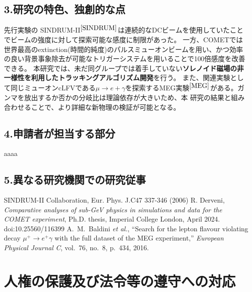\documentclass[11pt,a4j,dvipdfmx]{jarticle} 					%
\newcommand{\研究課題名}{ミューオン電子転換探索の感度向上に向けた解析手法の開発}
\newcommand{\研究機関名}{大阪大学}
\newcommand{\研究代表者氏名}{高見 翔太   }
\newcommand{\mysubsection}[1]{\vspace{-20pt}\subsection*{\colorbox{cyan!15}{\normalsize{#1}}}\vspace{-0.2cm}}
\begin{document}
\mysubsection{3.研究の特色、独創的な点}
先行実験の SINDRUM-I\hspace{-1.2pt}I$^{\cite{SINDRUM}}$は連続的なDCビームを使用していたことでビームの強度に対して探索可能な感度に制限があった。
一方、COMETでは世界最高のextinction(時間的純度)のパルスミューオンビームを用い、かつ効率の良い背景事象除去が可能なトリガーシステムを用いることで100倍感度を改善できる。
本研究では、未だ同グループでは着手していない\textbf{ソレノイド磁場の非一様性を利用したトラッキングアルゴリズム開発}を行う。
また、関連実験として同じミューオンcLFVである$\mu \rightarrow e + \gamma$を探索するMEG実験$^{\cite{MEG}}$がある。ガンマを放出するか否かの分岐比は理論依存が大きいため、本
研究の結果と組み合わせることで、より詳細な新物理の検証が可能となる。\\
\mysubsection{4.申請者が担当する部分}
aaaa
\mysubsection{5.異なる研究機関での研究従事}
\small
\begin{thebibliography}{99}
	 SINDRUM-II Collaboration, Eur. Phys. J.C47 337-346 (2006)
  R. Derveni, 
  \emph{Comparative analyses of sub-GeV physics in simulations and data for the COMET experiment},  
  Ph.D. thesis, Imperial College London, April 2024.  
	{doi:10.25560/116399}
	A.~M.~Baldini \textit{et al.}, ``Search for the lepton flavour violating decay $\mu^+ \to e^+ \gamma$ with the full dataset of the MEG experiment,'' \textit{European Physical Journal C}, vol.~76, no.~8, p.~434, 2016. 
\end{thebibliography}





\section{人権の保護及び法令等の遵守への対応}
\end{document}
